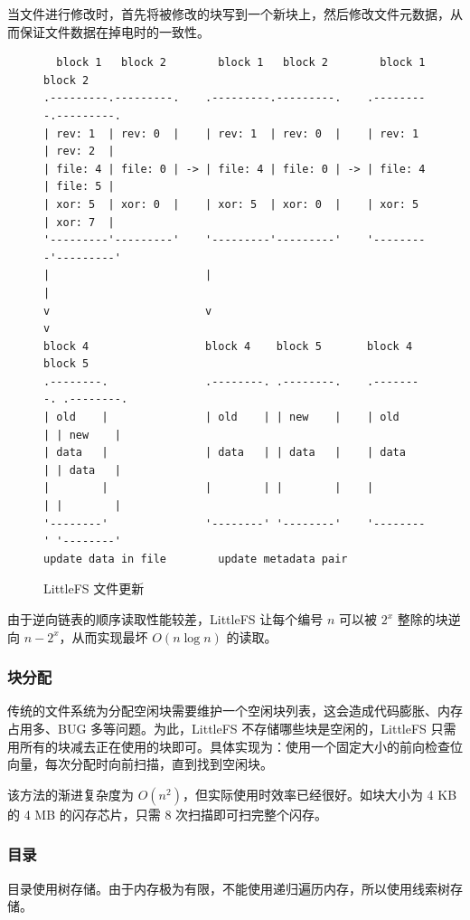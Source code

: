 \documentclass{ctexart}
\begin{document}
当文件进行修改时，首先将被修改的块写到一个新块上，然后修改文件元数据，从而保证文件数据在掉电时的一致性。

\begin{figure}
\begin{verbatim}
  block 1   block 2        block 1   block 2        block 1   block 2
.---------.---------.    .---------.---------.    .---------.---------.
| rev: 1  | rev: 0  |    | rev: 1  | rev: 0  |    | rev: 1  | rev: 2  |
| file: 4 | file: 0 | -> | file: 4 | file: 0 | -> | file: 4 | file: 5 |
| xor: 5  | xor: 0  |    | xor: 5  | xor: 0  |    | xor: 5  | xor: 7  |
'---------'---------'    '---------'---------'    '---------'---------'
|                        |                                  |
v                        v                                  v
block 4                  block 4    block 5       block 4    block 5
.--------.               .--------. .--------.    .--------. .--------.
| old    |               | old    | | new    |    | old    | | new    |
| data   |               | data   | | data   |    | data   | | data   |
|        |               |        | |        |    |        | |        |
'--------'               '--------' '--------'    '--------' '--------'
update data in file        update metadata pair
\end{verbatim}
\caption{LittleFS 文件更新}
\end{figure}

由于逆向链表的顺序读取性能较差，LittleFS 让每个编号 $n$ 可以被 $2^x$ 整除的块逆向 $n-2^x$，从而实现最坏 $O(n \log n)$ 的读取。

\subsubsection{块分配}

传统的文件系统为分配空闲块需要维护一个空闲块列表，这会造成代码膨胀、内存占用多、BUG 多等问题。为此，LittleFS 不存储哪些块是空闲的，LittleFS 只需用所有的块减去正在使用的块即可。具体实现为：使用一个固定大小的前向检查位向量，每次分配时向前扫描，直到找到空闲块。

该方法的渐进复杂度为 $O(n^2)$，但实际使用时效率已经很好。如块大小为 4 KB 的 4 MB 的闪存芯片，只需 8 次扫描即可扫完整个闪存。

\subsubsection{目录}

目录使用树存储。由于内存极为有限，不能使用递归遍历内存，所以使用线索树存储。
\end{document}
